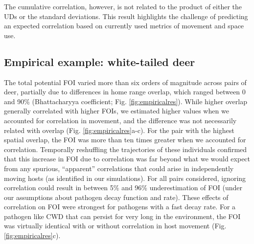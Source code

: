 \documentclass[letterpaper]{article}
\begin{document}
The cumulative correlation, however, is not related to the product of either the UDs or the standard deviations. This result highlights the challenge of predicting an expected correlation based on currently used metrics of movement and space use.


\subsection*{Empirical example: white-tailed deer}

The total potential FOI %
varied more than six orders of magnitude across pairs of deer, partially due to differences in home range overlap, which ranged between 0 and 90\% (Bhattacharyya coefficient; Fig. \ref{fig:empiricalres}). While higher overlap generally correlated with higher FOIs, we estimated higher values when we accounted for correlation in movement, and the difference was not necessarily related with overlap (Fig. \ref{fig:empiricalres}a-c).  For the pair with the highest spatial overlap, the FOI was more than ten times greater when we accounted for correlation. Temporally reshuffling the trajectories of these individuals  \citet[following ][]{Spiegel2016} confirmed that this increase in FOI due to correlation was far beyond what we would expect from any  spurious, ``apparent'' correlations that could arise in independently moving hosts (as identified in our simulations). For all pairs considered, ignoring correlation could result in between 5\% and 96\% underestimation of FOI (under our assumptions about pathogen decay function and rate). These effects of correlation on FOI were strongest for pathogens with a fast decay rate. For a pathogen like CWD that can persist for very long in the environment, the FOI was virtually identical with or without correlation in host movement (Fig. \ref{fig:empiricalres}c). 
\end{document}
